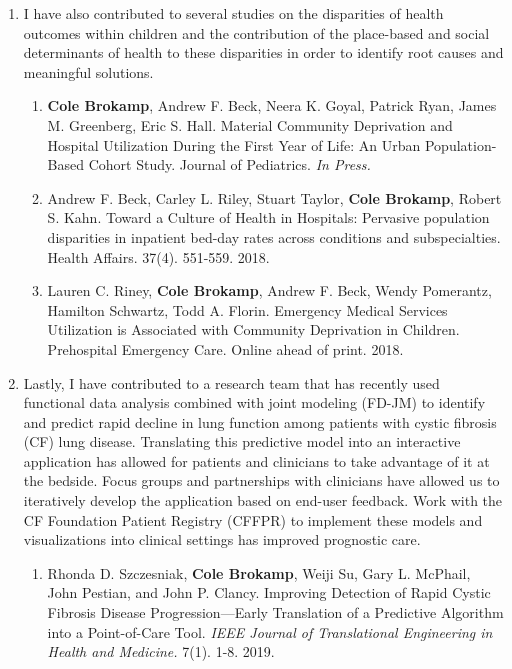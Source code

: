 \documentclass{nihbiosketch}
\begin{document}
\begin{enumerate}
\begin{enumerate}
	
\end{enumerate}


\item I have also contributed to several studies on the disparities of health outcomes within children and the contribution of the place-based and social determinants of health to these disparities in order to identify root causes and meaningful solutions.

\begin{enumerate}

	\item \textbf{Cole Brokamp}, Andrew F. Beck, Neera K. Goyal, Patrick Ryan, James M. Greenberg, Eric S. Hall. Material Community Deprivation and Hospital Utilization During the First Year of Life: An Urban Population-Based Cohort Study. Journal of Pediatrics. \textit{In Press.}
	
	\item Andrew F. Beck, Carley L. Riley, Stuart Taylor, \textbf{Cole Brokamp}, Robert S. Kahn. Toward a Culture of Health in Hospitals: Pervasive population disparities in inpatient bed-day rates across conditions and subspecialties. Health Affairs. 37(4). 551-559. 2018.
		
	\item Lauren C. Riney, \textbf{Cole Brokamp}, Andrew F. Beck, Wendy Pomerantz, Hamilton Schwartz, Todd A. Florin. Emergency Medical Services Utilization is Associated with Community Deprivation in Children. Prehospital Emergency Care. Online ahead of print. 2018.


\end{enumerate}

\item Lastly, I have contributed to a research team that has recently used functional data analysis combined with joint modeling (FD-JM) to identify and predict rapid decline in lung function among patients with cystic fibrosis (CF) lung disease. Translating this predictive model into an interactive application has allowed for patients and clinicians to take advantage of it at the bedside.  Focus groups and partnerships with clinicians have allowed us to iteratively develop the application based on end-user feedback. Work with the CF Foundation Patient Registry (CFFPR) to implement these models and visualizations into clinical settings has improved prognostic care.

\begin{enumerate}
	
	\item Rhonda D. Szczesniak, \textbf{Cole Brokamp}, Weiji Su, Gary L. McPhail,
    John Pestian, and John P. Clancy. Improving Detection of Rapid Cystic
    Fibrosis Disease Progression—Early Translation of a Predictive Algorithm
    into a Point-of-Care Tool. \textit{IEEE Journal of Translational Engineering
      in Health and Medicine.} 7(1). 1-8. 2019.


\end{enumerate}
\end{enumerate}
\end{document}
